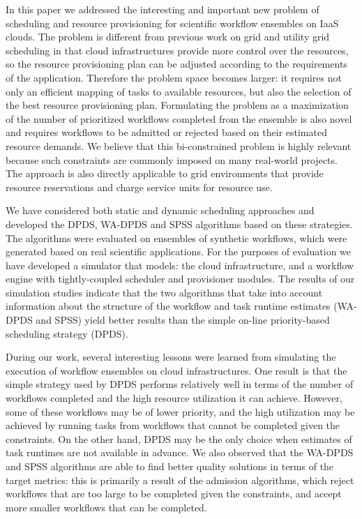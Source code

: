 \documentclass[conference]{IEEEtran}
\begin{document}
In this paper we addressed the interesting and important new problem of 
scheduling and resource provisioning for scientific workflow ensembles 
on IaaS clouds. The problem is different from previous work on grid and 
utility grid scheduling in that cloud infrastructures provide more control 
over the resources, so the resource provisioning plan can be adjusted 
according to the requirements of the application. Therefore the problem 
space becomes larger: it requires not only an efficient mapping of tasks
to available resources, but also the selection of the best resource 
provisioning plan. Formulating the problem as a maximization of the
number of prioritized workflows completed from the ensemble is also novel and  
requires workflows to be admitted or rejected based on their estimated 
resource demands. We believe that this bi-constrained problem is highly 
relevant because such constraints are commonly imposed on many real-world 
projects. The approach is also directly applicable to grid environments 
that provide resource reservations and charge service units for resource use.

We have considered both static and dynamic scheduling approaches and 
developed the DPDS, WA-DPDS and SPSS algorithms based on these 
strategies. The algorithms were evaluated on ensembles of synthetic 
workflows, which were generated based on real scientific applications. For 
the purposes of evaluation we have developed a simulator that models: the 
cloud infrastructure, and a workflow engine with tightly-coupled scheduler 
and provisioner modules. The results of our simulation studies indicate 
that the two algorithms that take into account information about the 
structure of the workflow and task runtime estimates (WA-DPDS and SPSS) 
yield better results than the simple on-line priority-based scheduling 
strategy (DPDS).

During our work, several interesting lessons were learned from simulating the execution of
workflow ensembles on cloud infrastructures. One result is that the simple 
strategy used by DPDS performs relatively well in terms of the number of 
workflows completed and the high resource utilization it can achieve. However,
some of these workflows may be of lower priority, and the high utilization
may be achieved by running tasks from workflows that cannot be completed
given the constraints. On the other hand, DPDS may be the only choice when 
estimates of task runtimes are not available in advance. We also observed
that the WA-DPDS and SPSS algorithms are able to find better quality 
solutions in terms of the target metrics: this is primarily a result of the 
admission algorithms, which reject workflows that are too large to be 
completed given the constraints, and accept more smaller workflows that 
can be completed.
\end{document}
